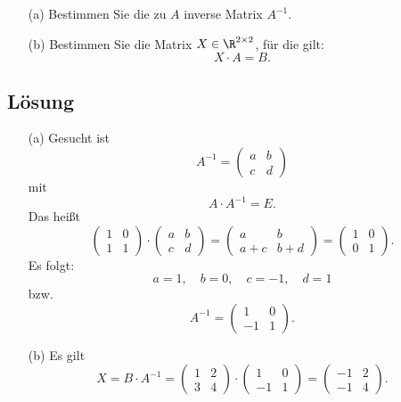 \begin{itemize}
	\item[(a)] Bestimmen Sie die zu $A$ inverse Matrix $A^{-1}$. 
	\item[(b)] Bestimmen Sie die Matrix $X\in \R^{2\times 2}$, f\"ur die gilt:
		$$
			X\cdot A = B.
		$$
\end{itemize}

\subsection*{L\"osung}

\begin{itemize}
	\item[(a)] 
		Gesucht ist 
		$$
			A^{-1} =
			\begin{pmatrix}
				a	&b	\\
				c	&d
			\end{pmatrix}
		$$
		mit
		$$
			A\cdot A^{-1} = E.
		$$
		Das hei{\ss}t
		$$
			\begin{pmatrix}
				1	&0	\\
				1	&1	
			\end{pmatrix}
			\cdot
			\begin{pmatrix}
				a	&b	\\
				c	&d
			\end{pmatrix}
			=
			\begin{pmatrix}
				a	&b	\\
				a+c	&b+d
			\end{pmatrix}	
			=
			\begin{pmatrix}
				1	&0	\\
				0	&1
			\end{pmatrix}.	
		$$
		Es folgt:
		$$
			a=1,\quad b=0,\quad c=-1,\quad d=1
		$$
		bzw.
		$$
			A^{-1} =
			\begin{pmatrix}
				1	&0	\\
				-1	&1
			\end{pmatrix}.
		$$
	\item[(b)]
		Es gilt
		$$
			X 
			= 
			B\cdot A^{-1}
			=
			\begin{pmatrix}
				1	&2	\\
				3	&4	
			\end{pmatrix}
			\cdot
			\begin{pmatrix}
				1	&0	\\
				-1	&1
			\end{pmatrix}
			=
			\begin{pmatrix}
				-1	&2	\\
				-1	&4
			\end{pmatrix}.									 
		$$
\end{itemize}

